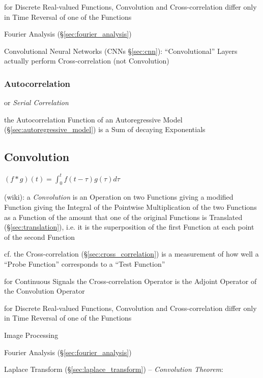 for Discrete Real-valued Functions, Convolution and Cross-correlation differ
only in Time Reversal of one of the Functions

\fist Fourier Analysis (\S\ref{sec:fourier_analysis})

Convolutional Neural Networks (CNNs \S\ref{sec:cnn}): ``Convolutional'' Layers
actually perform Cross-correlation (not Convolution)



\subsubsection{Autocorrelation}\label{sec:autocorrelation}

or \emph{Serial Correlation}

\fist the Autocorrelation Function of an Autoregressive Model
(\S\ref{sec:autoregressive_model}) is a Sum of decaying Exponentials



\subsection{Convolution}\label{sec:convolution}

$(f * g)(t) = \int_0^t f(t-\tau) g(\tau) d\tau$

(wiki): a \emph{Convolution} is an Operation on two Functions giving a modified
Function giving the Integral of the Pointwise Multiplication of the two
Functions as a Function of the amount that one of the original Functions is
Translated (\S\ref{sec:translation}), i.e. it is the superposition of the first
Function at each point of the second Function

cf. the Cross-correlation (\S\ref{sec:cross_correlation}) is a measurement of
how well a ``Probe Function'' corresponds to a ``Test Function''

for Continuous Signals the Cross-correlation Operator is the Adjoint Operator of
the Convolution Operator

for Discrete Real-valued Functions, Convolution and Cross-correlation differ
only in Time Reversal of one of the Functions

Image Processing

\fist Fourier Analysis (\S\ref{sec:fourier_analysis})

Laplace Transform (\S\ref{sec:laplace_transform}) -- \emph{Convolution Theorem}:

